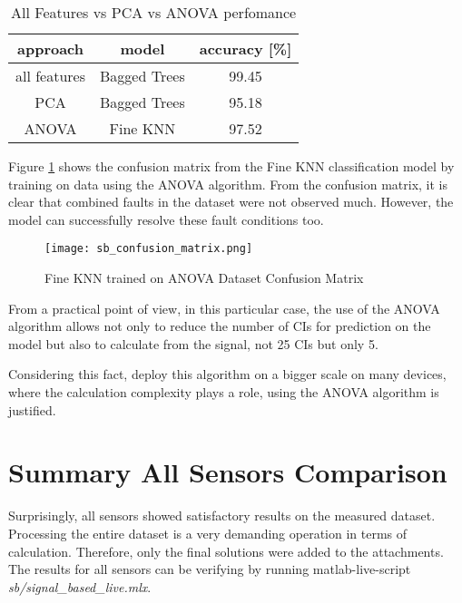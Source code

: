 \begin{table}[h!]
    \centering
    \begin{tabular}{|c|c|c|}
        \hline
        \textbf{approach} & \textbf{model}     &  \textbf{accuracy [\%]} \\
        \hline
        all features      &  Bagged Trees      &  99.45  \\
        PCA               &  Bagged Trees      &  95.18  \\
        ANOVA             &  Fine KNN          &  97.52  \\
        \hline
    \end{tabular}
    \caption{All Features vs PCA vs ANOVA perfomance}
    \label{tab:classification_perfomance}
\end{table}

Figure \ref{fig:conf_matrix} shows the confusion matrix from the Fine KNN
classification model by training on data using the ANOVA algorithm.  From
the confusion matrix, it is clear that combined faults in the dataset were
not observed much. However, the model can successfully resolve these fault
conditions too.

\begin{figure}[h!]
    \centering
    \texttt{[image: sb\_confusion\_matrix.png]}
    \caption{Fine KNN trained on ANOVA Dataset Confusion Matrix}
    \label{fig:conf_matrix}
\end{figure}

From a practical point of view, in this particular case, the use of the
ANOVA algorithm allows not only to reduce the number of CIs for prediction
on the model but also to calculate from the signal, not 25 CIs but only 5. 

Considering this fact, deploy this algorithm on a bigger scale on many
devices, where the calculation complexity plays a role, using the ANOVA
algorithm is justified.

\newpage
\section{Summary All Sensors Comparison}\label{sec:sensors_summary}

Surprisingly, all sensors showed satisfactory results on the measured
dataset.  Processing the entire dataset is a very demanding operation in
terms of calculation. Therefore, only the final solutions were added to the
attachments. The results for all sensors can be verifying by running
matlab-live-script \textit{sb/signal\_based\_live.mlx}.

